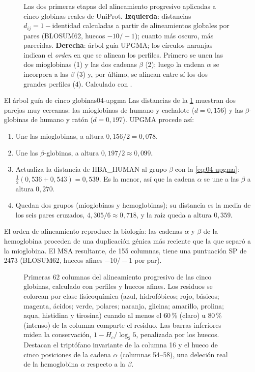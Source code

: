 \begin{figure}[tbp]
\centering

\caption[Matriz de distancias y árbol guía de cinco globinas]{Las dos primeras etapas del alineamiento progresivo aplicadas a cinco globinas reales de UniProt. \textbf{Izquierda}: distancias $d_{ij}=1-\text{identidad}$ calculadas a partir de alineamientos globales por pares (BLOSUM62, huecos $-10/-1$); cuanto más oscuro, más parecidas. \textbf{Derecha}: árbol guía UPGMA; los círculos naranjas indican el \emph{orden} en que se alinean los perfiles. Primero se unen las dos mioglobinas (1) y las dos cadenas $\beta$ (2); luego la cadena $\alpha$ se incorpora a las $\beta$ (3) y, por último, se alinean entre sí los dos grandes perfiles (4). Calculado con .}
\label{fig:04-arbol}
\end{figure}

\begin{ejemplo}{El árbol guía de cinco globinas}{04-upgma}
Las distancias de la \cref{fig:04-arbol} muestran dos parejas muy cercanas: las mioglobinas de humano y cachalote ($d=0{,}156$) y las $\beta$-globinas de humano y ratón ($d=0{,}197$). UPGMA procede así:
\begin{enumerate}
  \item Une las mioglobinas, a altura $0{,}156/2=0{,}078$.
  \item Une las $\beta$-globinas, a altura $0{,}197/2\approx0{,}099$.
  \item Actualiza la distancia de HBA\_HUMAN al grupo $\beta$ con la \cref{eq:04-upgma}: $\tfrac12(0{,}536+0{,}543)=0{,}539$. Es la menor, así que la cadena $\alpha$ se une a las $\beta$ a altura $0{,}270$.
  \item Quedan dos grupos (mioglobinas y hemoglobinas); su distancia es la media de los seis pares cruzados, $4{,}305/6\approx0{,}718$, y la raíz queda a altura $0{,}359$.
\end{enumerate}
El orden de alineamiento reproduce la biología: las cadenas $\alpha$ y $\beta$ de la hemoglobina proceden de una duplicación génica más reciente que la que separó a la mioglobina. El MSA resultante, de 155 columnas, tiene una puntuación SP de $2473$ (BLOSUM62, huecos afines $-10/-1$ por par).
\end{ejemplo}

\begin{figure}[tbp]
\centering

\caption[Fragmento del MSA progresivo de globinas]{Primeras 62 columnas del alineamiento progresivo de las cinco globinas, calculado con perfiles y huecos afines. Los residuos se colorean por clase fisicoquímica (azul, hidrofóbicos; rojo, básicos; magenta, ácidos; verde, polares; naranja, glicina; amarillo, prolina; aqua, histidina y tirosina) cuando al menos el 60\,\% (claro) u 80\,\% (intenso) de la columna comparte el residuo. Las barras inferiores miden la conservación, $1-H_c/\log_2 5$, penalizada por los huecos. Destacan el triptófano invariante de la columna 16 y el hueco de cinco posiciones de la cadena $\alpha$ (columnas 54--58), una deleción real de la hemoglobina $\alpha$ respecto a la $\beta$.}
\label{fig:04-msa}
\end{figure}


